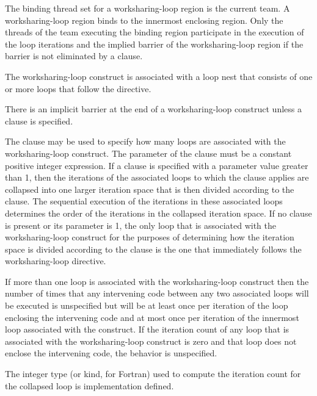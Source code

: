 \binding
The binding thread set for a worksharing-loop region is the current team. A
worksharing-loop region binds to the innermost enclosing  region. 
Only the threads of the team executing the binding  region 
participate in the execution of the loop iterations and the implied barrier 
of the worksharing-loop region if the barrier is not eliminated by a 
 clause.

\descr
The worksharing-loop construct is associated with a loop nest that consists
of one or more loops that follow the directive.

There is an implicit barrier at the end of a worksharing-loop construct 
unless a  clause is specified.

The  clause may be used to specify how many loops are
associated with the worksharing-loop construct. The parameter of the 
clause must be a constant positive integer expression. If a 
clause is specified with a parameter value greater than 1, then the
iterations of the associated loops to which the clause applies are collapsed
into one larger iteration space that is then divided according
to the  clause. The sequential execution of the iterations
in these associated loops determines the order of the iterations in the
collapsed iteration space. If no  clause is present or its
parameter is 1, the only loop that is associated with the worksharing-loop construct
for the purposes of determining how the iteration space is divided according
to the  clause is the one that immediately follows the
worksharing-loop directive.

If more than one loop is associated with the worksharing-loop construct then the
number of times that any intervening code between any two associated
loops will be executed is unspecified but will be at least once per
iteration of the loop enclosing the intervening code and at most once
per iteration of the innermost loop associated with the construct. If the
iteration count of any loop that is associated with the
worksharing-loop construct is zero and that loop does not enclose the
intervening code, the behavior is unspecified.

The integer type (or kind, for Fortran) used to compute the iteration count
for the collapsed loop is implementation defined.

